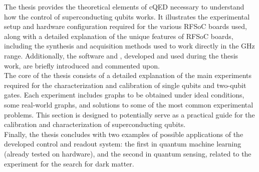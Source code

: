 %
The thesis provides the theoretical elements of cQED necessary to understand how the control of superconducting qubits works.
It illustrates the experimental setup and hardware configuration required for the various RFSoC boards used, along with a detailed explanation of the unique features of RFSoC boards, including the synthesis and acquisition methods used to work directly in the GHz range. 
Additionally, the software \Qibosoq and \Qibolab, developed and used during the thesis work, are briefly introduced and commented upon.\\
%
The core of the thesis consists of a detailed explanation of the main experiments required for the characterization and calibration of single qubits and two-qubit gates.
Each experiment includes graphs to be obtained under ideal conditions, some real-world graphs, and solutions to some of the most common experimental problems.
This section is designed to potentially serve as a practical guide for the calibration and characterization of superconducting qubits.\\
%
Finally, the thesis concludes with two examples of possible applications of the developed control and readout system: the first in quantum machine learning (already tested on hardware), and the second in quantum sensing, related to the experiment for the search for dark matter.